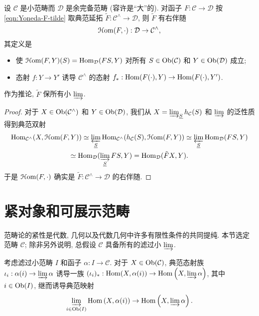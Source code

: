\begin{proposition}\label{prop:Yoneda-F-tilde}
	设 $\mathcal{C}$ 是小范畴而 $\mathcal{D}$ 是余完备范畴 (容许是``大''的). 对函子 $F: \mathcal{C} \to \mathcal{D}$ 按 \eqref{eqn:Yoneda-F-tilde} 取典范延拓 $\tilde{F}: \mathcal{C}^\wedge \to \mathcal{D}$, 则 $\tilde{F}$ 有右伴随
	\[ \EuScript{H}\mathrm{om}(F, \cdot): \mathcal{D} \to \mathcal{C}^\wedge , \]
	其定义是
	\begin{itemize}
		\item 使 $\EuScript{H}\mathrm{om}(F, Y)(S) = \operatorname{Hom}_{\mathcal{D}}(FS, Y)$ 对所有 $S \in \operatorname{Ob}(\mathcal{C})$ 和 $Y \in \operatorname{Ob}(\mathcal{D})$ 成立;
		\item 态射 $f: Y \to Y'$ 诱导 $\mathcal{C}^\wedge$ 的态射 $f_*: \operatorname{Hom}(F(\cdot), Y) \to \operatorname{Hom}(F(\cdot), Y')$.
	\end{itemize}

	作为推论, $\tilde{F}$ 保所有小 $\varinjlim$.
\end{proposition}
\begin{proof}
	对于 $X \in \operatorname{Ob}(\mathcal{C}^\wedge)$ 和 $Y \in \operatorname{Ob}(\mathcal{D})$, 我们从 $X = \varinjlim_{\underline{S}} h_{\mathcal{C}}(S)$ 和 $\varinjlim$ 的泛性质得到典范双射
	\begin{multline*}
		\operatorname{Hom}_{\mathcal{C}^\wedge}(X, \EuScript{H}\mathrm{om}(F, Y)) \simeq \varprojlim_{\underline{S}} \operatorname{Hom}_{\mathcal{C}^\wedge}(h_{\mathcal{C}}(S), \EuScript{H}\mathrm{om}(F, Y)) \simeq \varprojlim_{\underline{S}} \operatorname{Hom}_{\mathcal{D}}(FS, Y) \\
		\simeq \operatorname{Hom}_{\mathcal{D}}(\varinjlim_{\underline{S}} FS, Y ) = \operatorname{Hom}_{\mathcal{D}}(\tilde{F}X, Y).
	\end{multline*}
	于是 $\EuScript{H}\mathrm{om}(F, \cdot)$ 确实是 $\tilde{F}: \mathcal{C}^\wedge \to \mathcal{D}$ 的右伴随.
\end{proof}

\section{紧对象和可展示范畴}\label{sec:cpt-objects}
范畴论的紧性是代数, 几何以及代数几何中许多有限性条件的共同提纯. 本节选定范畴 $\mathcal{C}$; 除非另外说明, 总假设 $\mathcal{C}$ 具备所有的滤过小 $\varinjlim$.

考虑滤过小范畴 $I$ 和函子 $\alpha: I \to \mathcal{C}$. 对于 $X \in \operatorname{Ob}(\mathcal{C})$, 典范态射族 $\iota_i: \alpha(i) \to \varinjlim \alpha$ 诱导一族 $(\iota_i)_*: \operatorname{Hom}(X, \alpha(i)) \to \operatorname{Hom}\left(X, \varinjlim \alpha \right)$, 其中 $i \in \operatorname{Ob}(I)$, 继而诱导典范映射
\begin{equation}\label{eqn:I-small-gen}
	\varinjlim_{i \in \operatorname{Ob}(I)} \operatorname{Hom}\left( X, \alpha(i) \right) \to \operatorname{Hom}\left( X, \varinjlim \alpha \right).
\end{equation}


